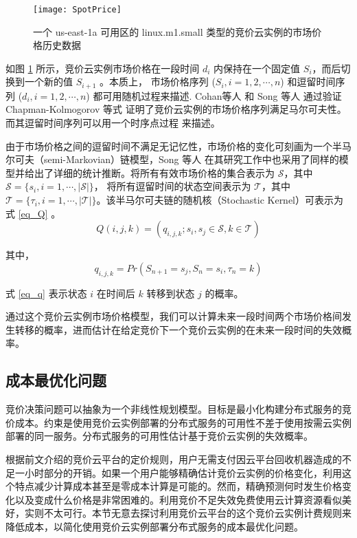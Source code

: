\begin{figure}
  \centering
  \texttt{[image: SpotPrice]}
  \caption{一个 us-east-1a 可用区的 linux.m1.small 类型的竞价云实例的市场价格历史数据}
  \label{figure:sil}
\end{figure}

如图 \ref{figure:sil} 所示，竞价云实例市场价格在一段时间 $d_i$ 内保持在一个固定值 $S_{i}$，而后切换到一个新的值 $S_{i+1}$ 。本质上，
市场价格序列 ($S_i, i = 1, 2, \cdots, n$) 和逗留时间序列 ($d_i, i = 1, 2, \cdots, n$) 都可用随机过程来描述. Cohan等人 \cite{chohan2010see} 和 Song 等人 \cite{song2012optimal} 通过验证 Chapman-Kolmogorov 等式 \cite{grimmett1992probability} 证明了竞价云实例的市场价格序列满足马尔可夫性。而其逗留时间序列可以用一个时序点过程 \cite{eltit} 来描述。

由于市场价格之间的逗留时间不满足无记忆性，市场价格的变化可刻画为一个半马尔可夫（semi-Markovian）链模型，Song 等人 \cite{song2012optimal} 在其研究工作中也采用了同样的模型并给出了详细的统计推断。将所有有效市场价格的集合表示为 $\mathcal{S}$，其中 $\mathcal{S} = \{s_i, i = 1, \cdots, \left|\mathcal{S}\right|\}$， 将所有逗留时间的状态空间表示为 $\mathcal{T}$，其中 $\mathcal{T} = \{\tau_i, i = 1, \cdots, \left|\mathcal{T}\right|\}$。该半马尔可夫链的随机核（Stochastic Kernel）可表示为式 \eqref{eq_Q} 。
\begin{equation}\label{eq_Q}
Q(i, j, k) = (q_{i, j, k}; s_i, s_j \in \mathcal{S}, k \in \mathcal{T})
\end{equation}

其中，
\begin{equation}\label{eq_q}
q_{i, j, k} = Pr(S_{n+1} = s_j, S_n = s_i, \tau_n = k)
\end{equation}

式 \eqref{eq_q} 表示状态 $i$ 在时间后 $k$ 转移到状态 $j$ 的概率。

通过这个竞价云实例市场价格模型，我们可以计算未来一段时间两个市场价格间发生转移的概率，进而估计在给定竞价下一个竞价云实例的在未来一段时间的失效概率。

\subsection{成本最优化问题}
竞价决策问题可以抽象为一个非线性规划模型。目标是最小化构建分布式服务的竞价成本。约束是使用竞价云实例部署的分布式服务的可用性不差于使用按需云实例部署的同一服务。分布式服务的可用性估计基于竞价云实例的失效概率。

根据前文介绍的竞价云平台的定价规则，用户无需支付因云平台回收机器造成的不足一小时部分的开销。如果一个用户能够精确估计竞价云实例的价格变化，利用这个特点减少计算成本甚至是零成本计算是可能的。然而，精确预测何时发生价格变化以及变成什么价格是非常困难的。利用竞价不足失效免费使用云计算资源看似美好，实则不太可行。本节无意去探讨利用竞价云平台的这个竞价云实例计费规则来降低成本，以简化使用竞价云实例部署分布式服务的成本最优化问题。

